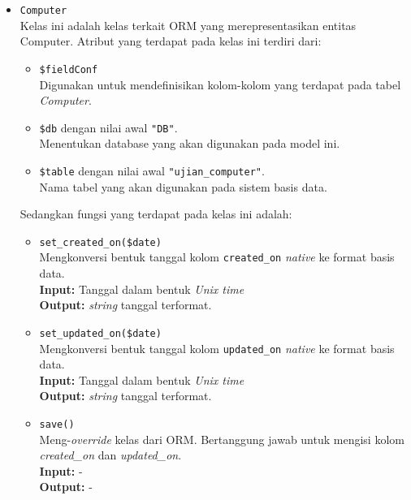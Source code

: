     \begin{itemize}
        \item \texttt{Computer} \\
            Kelas ini adalah kelas terkait ORM yang merepresentasikan entitas Computer. Atribut yang 
            terdapat pada kelas ini terdiri dari:
            \begin{itemize}
                \item \texttt{\$fieldConf} \\
                    Digunakan untuk mendefinisikan kolom-kolom yang terdapat pada tabel \textit{Computer}.
                \item \texttt{\$db} dengan nilai awal \texttt{"DB"}. \\
                    Menentukan database yang akan digunakan pada model ini.
                \item \texttt{\$table} dengan nilai awal \texttt{"ujian\_computer"}. \\
                    Nama tabel yang akan digunakan pada sistem basis data. 
            \end{itemize}
            Sedangkan fungsi yang terdapat pada kelas ini adalah:
            \begin{itemize}
                \item \texttt{set\_created\_on(\$date)} \\
                    Mengkonversi bentuk tanggal kolom \texttt{created\_on} \textit{native} ke 
                    format basis data. \\
                    \textbf{Input:} Tanggal dalam bentuk \textit{Unix time}\\
                    \textbf{Output:} \textit{string} tanggal terformat.
                
                \item \texttt{set\_updated\_on(\$date)} \\
                    Mengkonversi bentuk tanggal kolom \texttt{updated\_on} \textit{native} ke 
                    format basis data. \\
                    \textbf{Input:} Tanggal dalam bentuk \textit{Unix time}\\
                    \textbf{Output:} \textit{string} tanggal terformat.
                
                \item \texttt{save()}\\
                    Meng-\textit{override} kelas dari ORM. Bertanggung jawab untuk mengisi
                    kolom \textit{created\_on} dan \textit{updated\_on}.\\
                    \textbf{Input:} -\\
                    \textbf{Output:} -
            \end{itemize}
            

\end{itemize}

